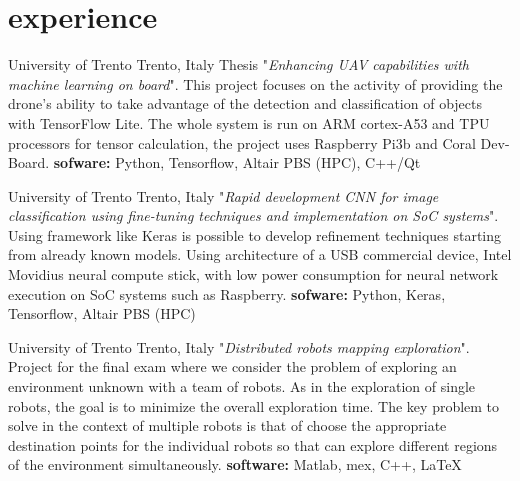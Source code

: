 \documentclass[a4,oneside]{friggeri-cv} %
\begin{document}
\section{experience}
  \begin{entrylist}
    {University of Trento}
    {Trento, Italy}
    {Thesis "\emph{Enhancing UAV capabilities with machine learning on board}".}
    {This project focuses on the activity of providing the drone's ability to
take advantage of the detection and classification of objects with TensorFlow
Lite. The whole system is run on ARM cortex-A53 and TPU processors for tensor
calculation, the project uses Raspberry Pi3b and Coral Dev-Board.}
    {\textbf{sofware:} Python, Tensorflow, Altair PBS (HPC), C++/Qt} 
    {\href{https://github.com/frank1789/MasterThesis}{\faGithub}}
    

    {University of Trento}
    {Trento, Italy}
    {"\emph{Rapid development CNN for image classification using fine-tuning
techniques and implementation on SoC systems}".}
    {Using framework like Keras is possible to develop refinement techniques
starting from already known models. Using architecture of a USB commercial
device, Intel Movidius neural compute stick, with low power consumption for
neural network execution on SoC systems such as Raspberry.}
    {\textbf{sofware:} Python, Keras, Tensorflow, Altair PBS (HPC)}
    {\href{https://github.com/frank1789/NeuralNetworks}{\faGithub}}
      

    {University of Trento}
    {Trento, Italy}
    {"\emph{Distributed robots mapping exploration}".}
    {Project for the final exam where we consider the problem of exploring an
environment unknown with a team of robots. As in the exploration of single
robots, the goal is to minimize the overall exploration time. The key problem to
solve in the context of multiple robots is that of choose the appropriate
destination points for the individual robots so that can explore different
regions of the environment simultaneously.}
    {\textbf{software:} Matlab, mex, C++, \LaTeX}
    {\href{https://github.com/frank1789/DistributedSystemProject}{\faGithub}}
      
\end{entrylist}
\end{document}
